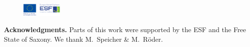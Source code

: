 \documentclass{llncs}
\begin{document}

\begin{figure}
 \vspace{-8mm}
 \includegraphics[width=0.18\textwidth]{esf.pdf}
\end{figure}
\textbf{Acknowledgments.} Parts of this work were supported by the ESF and the Free State of Saxony. We thank M.~Speicher \& M.~R\"oder.
 

  
 
\end{document}
